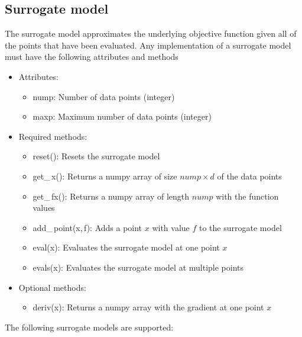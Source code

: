 \documentclass[]{article}
\begin{document}
\subsection{Surrogate model} 
\label{surrogate}
The surrogate model approximates the underlying objective function given all of the points that have been evaluated. Any implementation of
a surrogate model must have the following attributes and methods
\begin{itemize}
\item[] {Attributes}: 
\begin{itemize}
\item nump: Number of data points (integer)
\item maxp: Maximum number of data points (integer)
\end{itemize}
\item[] {Required methods}:
\begin{itemize}
\item reset(): Resets the surrogate model
\item get\_\,x(): Returns a numpy array of size $nump \times d$ of the data points
\item get\_\,fx(): Returns a numpy array of length $nump$ with the function values
\item add\_\,point(x,\,f): Adds a point $x$ with value $f$ to the surrogate model
\item eval(x): Evaluates the surrogate model at one point $x$
\item evals(x): Evaluates the surrogate model at multiple points
\end{itemize}
\item[] {Optional methods}:
\begin{itemize}
\item deriv(x): Returns a numpy array with the gradient at one point $x$
\end{itemize}
\end{itemize}
The following surrogate models are supported:
\end{document}
